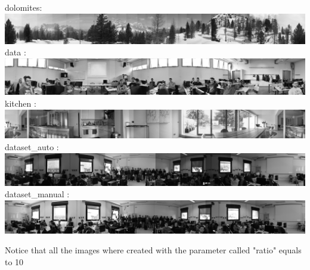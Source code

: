 \documentclass{article}
\begin{document}
dolomites: \\
\hspace*{-4.5cm}
\includegraphics[scale = 0.20]{images/dolomites.PNG}\\
data : \\
\hspace*{-4.5cm}
\includegraphics[scale = 0.16]{images/data.PNG}\\
kitchen : \\
\hspace*{-4.5cm}
\includegraphics[scale = 0.13]{images/kitchen.PNG}\\
dataset\_auto :\\
\hspace*{-4.5cm}
\includegraphics[scale = 0.09]{images/datasetAuto.PNG}\\
dataset\_manual : \\
\hspace*{-4.5cm}
\includegraphics[scale = 0.09]{images/datasetManual.PNG}\\

\begin{flushleft}
Notice that all the images where created with the parameter called "ratio" equals to 10
\end{flushleft}
\end{document}
